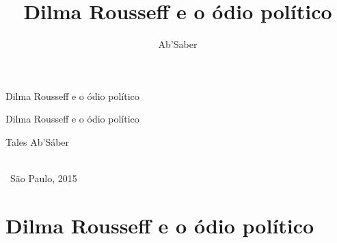 \documentclass[showtrims,12pt]{memoir}
\author{Ab'Saber}
\title{Dilma Rousseff e o \'odio pol\'itico}
\begin{document}
\fontsize{13.5pt}{17.6}\selectfont
{}

\pagestyle{empty}

{\LARGE\centering\vspace*{6em}\thispagestyle{empty}
Dilma Rousseff e o \'odio pol\'itico\\

\vfill\pagebreak\par}

\blank

{\LARGE\centering\vspace*{6em}\thispagestyle{empty}
Dilma Rousseff e o \'odio pol\'itico\\\bigskip

\Large Tales Ab'S\'aber\\\bigskip


\vfill
\logoum\\
\ S\~ao Paulo, 2015
\pagebreak\par}




\pagebreak



\setcounter{tocdepth}{0}
\setcounter{secnumdepth}{-2}

\pagebreak\mbox{}\pagebreak\tableofcontents*

\pagestyle{estilo}


\part{Dilma Rousseff e o \'odio pol\'itico}







\end{document}
